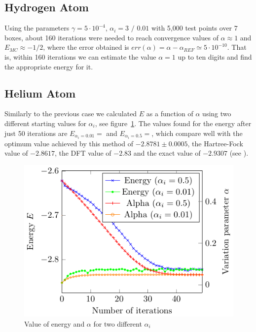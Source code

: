\subsection{Hydrogen Atom}
Using the parameters
$\gamma = 5\cdot 10^{-4}$, $\alpha_i = 3 \text{~/~}0.01$ with 5,000
test points over $7$ boxes, about 160 iterations were needed to reach convergence
values of $\alpha \approx 1$ and $E_{MC} \approx - 1/2$, where the error obtained is
$err(\alpha) = \alpha-\alpha_{REF} \simeq 5 \cdot 10^{-10}$. That is, within 160
iterations we can estimate the value $\alpha=1$ up to ten digits and find the appropriate energy for it.


\subsection{Helium Atom}

Similarly to the previous case we calculated $E$ as a function of $\alpha$
using two different starting values for $\alpha_i$, see figure~\ref{fig:He_it}.
The values found for the energy after just 50 iterations are
$E_{\alpha_i = 0.01} =  $ and $E_{\alpha_i = 0.5} =  $, which
compare well with the optimum value achieved by this method
of $-2.8781 \pm 0.0005$, the Hartree-Fock value of $-2.8617$,
the DFT value of $-2.83$ and the exact value of $-2.9307$ (see \cite{JosBook}). %

\begin{figure}
  \begin{center}
  \includegraphics[scale=1 ]{graphs/he-e-alpha-iterations.pdf}
  \caption{
	Value of energy and $\alpha$ for two different $\alpha_i$
  	}
  \label{fig:He_it}
  \end{center}
\end{figure}
